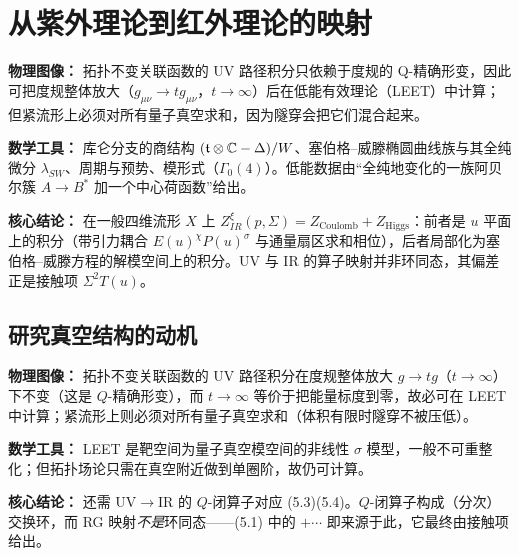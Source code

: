 
\section{从紫外理论到红外理论的映射}

\begin{keytakeaways}
\item \textbf{物理图像：} 拓扑不变关联函数的 UV 路径积分只依赖于度规的 Q-精确形变，因此可把度规整体放大（$g_{\mu\nu}\to t g_{\mu\nu}$，$t\to\infty$）后在低能有效理论（LEET）中计算；但紧流形上必须对所有量子真空求和，因为隧穿会把它们混合起来。
\item \textbf{数学工具：} 库仑分支的商结构 $(\mathfrak{t}\otimes\mathbb{C}-\Delta)/W$、塞伯格--威滕椭圆曲线族与其全纯微分 $\lambda_{SW}$、周期与预势、模形式（$\Gamma_{0}(4)$）。低能数据由“全纯地变化的一族阿贝尔簇 $A\to B^{*}$ 加一个中心荷函数”给出。
\item \textbf{核心结论：} 在一般四维流形 $X$ 上
$Z^{\xi}_{IR}(p,\Sigma)=Z_{\text{Coulomb}}+Z_{\text{Higgs}}$：前者是 $u$ 平面上的积分（带引力耦合 $E(u)^{\chi}P(u)^{\sigma}$ 与通量扇区求和相位），后者局部化为塞伯格--威滕方程的解模空间上的积分。UV 与 IR 的算子映射并非环同态，其偏差正是接触项 $\Sigma^{2}T(u)$。
\end{keytakeaways}

\subsection{研究真空结构的动机}

\begin{keytakeaways}
\item \textbf{物理图像：} 拓扑不变关联函数的 UV 路径积分在度规整体放大 $g\to tg$（$t\to\infty$）下不变（这是 $Q$-精确形变），而 $t\to\infty$ 等价于把能量标度到零，故必可在 LEET 中计算；紧流形上则必须对所有量子真空求和（体积有限时隧穿不被压低）。
\item \textbf{数学工具：} LEET 是靶空间为量子真空模空间的非线性 $\sigma$ 模型，一般不可重整化；但拓扑场论只需在真空附近做到单圈阶，故仍可计算。
\item \textbf{核心结论：} 还需 UV$\to$IR 的 $Q$-闭算子对应 (5.3)(5.4)。$Q$-闭算子构成（分次）交换环，而 RG 映射\emph{不是}环同态——(5.1) 中的 $+\cdots$ 即来源于此，它最终由接触项给出。
\end{keytakeaways}


